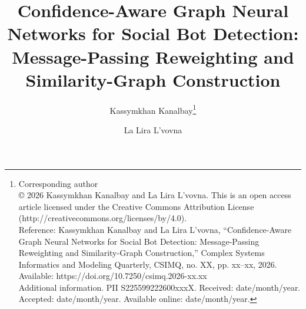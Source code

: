\documentclass{csimq}
\begin{document}
\title{Confidence-Aware Graph Neural Networks for Social Bot Detection: Message-Passing Reweighting and Similarity-Graph Construction}

\author{Kassymkhan Kanalbay\protect\footnote[1]{Corresponding author\vspace{0.6em} \\%
© 2026 Kassymkhan Kanalbay and La Lira L'vovna. This is an open access article licensed under the Creative Commons Attribution License (http://creativecommons.org/licenses/by/4.0).\vspace{0.6em} \\%
%
Reference: Kassymkhan Kanalbay and La Lira L'vovna, “Confidence-Aware Graph Neural Networks for Social Bot Detection: Message-Passing Reweighting and Similarity-Graph Construction,” Complex Systems Informatics and Modeling Quarterly, CSIMQ, no. XX, pp. xx--xx, 2026. Available: https://doi.org/10.7250/csimq.2026-xx.xx \vspace{0.6em} \\%
%
Additional information. PII S225599222600xxxX. Received: date/month/year. Accepted: date/month/year. Available online: date/month/year.}%
\and La Lira L'vovna}


\maketitle
{}
\end{document}
